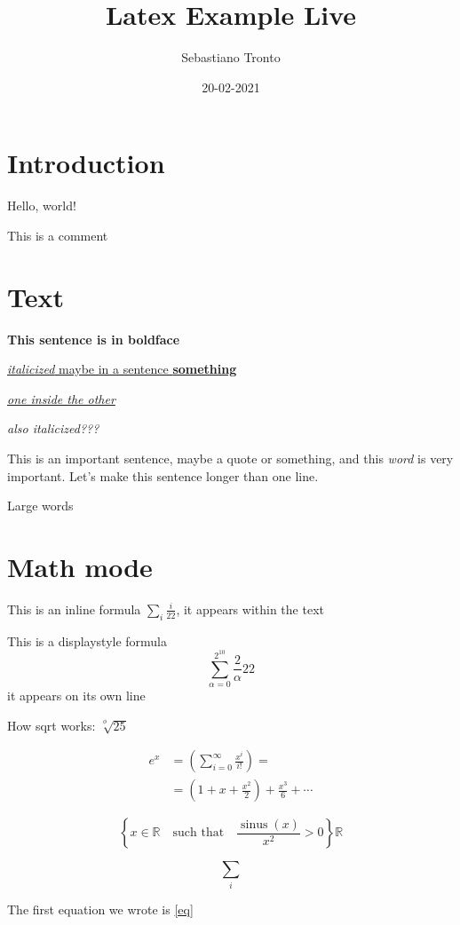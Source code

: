 \documentclass[10pt,a4paper]{article}
\title{Latex Example Live}
\author{Sebastiano Tronto}
\date{20-02-2021}
\newcommand{\reals}{\mathbb{R}}
\DeclareMathOperator{\sinus}{sinus}
\theoremstyle{definition}
\theoremstyle{remark}
\begin{document}
\maketitle

\section{Introduction}

Hello, world!

This is a comment

\section{Text}

\textbf{This sentence is in boldface}

\underline{\textit{italicized} maybe in a sentence \textbf{something}}

\underline{\textit{one inside the other}}

\emph{also italicized???}

This is an important sentence, maybe a quote or something, and this \emph{word} is very important. Let's make this sentence longer than one line.

{\Huge Large words}


\section{Math mode}

This is an inline formula \( \sum_i \frac{i}{22} \), it appears within the text

This is a displaystyle formula \[ \sum_{\alpha=0}^{2^{10}}   \frac2 \alpha{22} \] it appears on its own line

How sqrt works: \( \sqrt[\phi]{25} \)



\begin{align}
\label{eq}
e^x &= \left(\sum_{i=0}^\infty \frac{x^i}{i!} \right) = \\
&= \left( 1 + x  + \frac{x^2}2  \right)+ \frac{x^3}{6} + \cdots \nonumber
\end{align}

\[
   \left\{ x \in \reals \quad \text{such that} \quad \frac{ \sinus(x)}{x^2}>0 \right\}\reals
\]

\[ \sum_i \]

The first equation we wrote is \eqref{eq}
\end{document}

